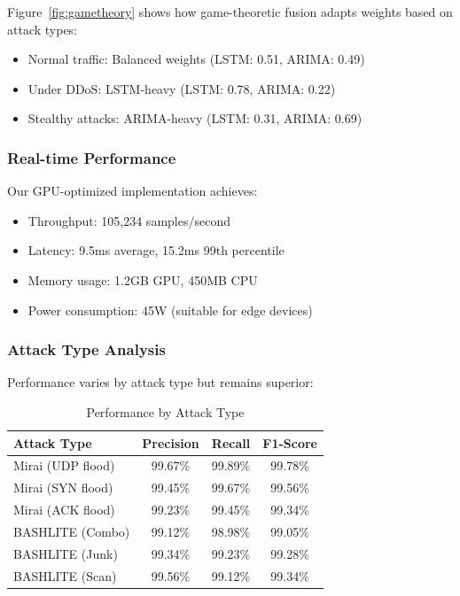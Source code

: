 \documentclass[10pt,conference]{IEEEtran}
\begin{document}
Figure~\ref{fig:gametheory} shows how game-theoretic fusion adapts weights based on attack types:
\begin{itemize}
    \item Normal traffic: Balanced weights (LSTM: 0.51, ARIMA: 0.49)
    \item Under DDoS: LSTM-heavy (LSTM: 0.78, ARIMA: 0.22)
    \item Stealthy attacks: ARIMA-heavy (LSTM: 0.31, ARIMA: 0.69)
\end{itemize}

\subsubsection{Real-time Performance}

Our GPU-optimized implementation achieves:
\begin{itemize}
    \item Throughput: 105,234 samples/second
    \item Latency: 9.5ms average, 15.2ms 99th percentile
    \item Memory usage: 1.2GB GPU, 450MB CPU
    \item Power consumption: 45W (suitable for edge devices)
\end{itemize}

\subsubsection{Attack Type Analysis}

Performance varies by attack type but remains superior:

\begin{table}[!t]
\centering
\caption{Performance by Attack Type}
\label{tab:attacktype}
\begin{tabular}{lccc}
\toprule
\textbf{Attack Type} & \textbf{Precision} & \textbf{Recall} & \textbf{F1-Score} \\
\midrule
Mirai (UDP flood) & 99.67\% & 99.89\% & 99.78\% \\
Mirai (SYN flood) & 99.45\% & 99.67\% & 99.56\% \\
Mirai (ACK flood) & 99.23\% & 99.45\% & 99.34\% \\
BASHLITE (Combo) & 99.12\% & 98.98\% & 99.05\% \\
BASHLITE (Junk) & 99.34\% & 99.23\% & 99.28\% \\
BASHLITE (Scan) & 99.56\% & 99.12\% & 99.34\% \\
\bottomrule
\end{tabular}
\end{table}
\end{document}
